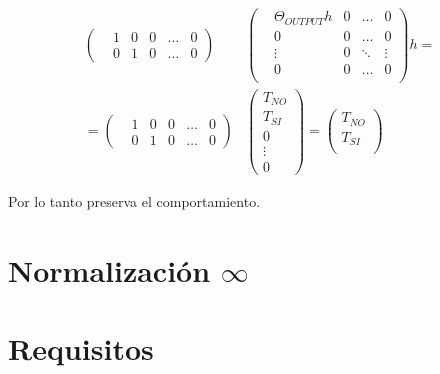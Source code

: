 \documentclass{article}
\begin{document}
\begin{align*}
    \left(\begin{matrix}
        &1 &0 &0 &\dots &0 \\
        &0 &1 &0 &\dots &0 
    \end{matrix}\right)
    &\left(\begin{matrix}
        &\Theta_{OUTPUT}h &0 &\dots  &0 \\
        &0                &0 &\dots  &0 \\
        &\vdots           &0 &\ddots &\vdots \\
        &0                &0 &\dots  &0 \\
    \end{matrix}\right)h = \\
    = \left(\begin{matrix}
        &1 &0 &0 &\dots &0 \\
        &0 &1 &0 &\dots &0 
    \end{matrix}\right)
    &\left(\begin{matrix}
        T_{NO} \\
        T_{SI} \\ 
        0 \\
        \vdots \\
        0
    \end{matrix}\right) = 
    \left(\begin{matrix}
        T_{NO} \\
        T_{SI} \\ 
    \end{matrix}\right)
\end{align*}

Por lo tanto preserva el comportamiento.



\section*{Normalización $\infty$}


\section*{Requisitos}
\end{document}
